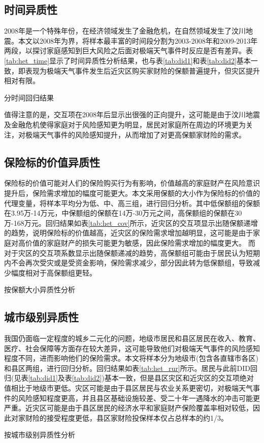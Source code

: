 \subsection{时间异质性}
2008年是一个特殊年份，在经济领域发生了金融危机，在自然领域发生了汶川地震。本文以2008年为界，将样本最丰富的时间段分割为2003-2008年和2009-2013年两段，以探讨家庭感知到巨大风险之后面对极端天气事件时反应是否有差异。表\ref{tab:het_time}显示了时间异质性分析结果，也与表\ref{tab:did1}和表\ref{tab:did2}基本一致，即表现为极端天气事件发生后近灾区购买家财险的保额普遍提升，但灾区提升相对有限。

\begin{table}[H]
    \centering
    \caption{分时间回归结果}\label{tab:het_time}
    
\end{table}

值得注意的是，交互项在2008年后显示出很强的正向提升，这可能是由于汶川地震及金融危机使得家庭对于风险感知更为明显，居民对家庭所在周边的环境更为关注，对极端天气事件的风险感知提升，从而增加了对更高保额家财险的需求。

\subsection{保险标的价值异质性}

保险标的价值可能对人们的保险购买行为有影响，价值越高的家庭财产在风险意识提升后，保险需求增加的幅度可能更大。本文采用保额的大小作为保险标的价值的代理变量，将样本平均分为低、中、高三组，进行回归分析。其中低保额组的保额在3.95万-14万元，中保额组的保额在14万-30万元之间，高保额组的保额在30万-168万元。回归结果如表\ref{tab:het_cov}所示，近灾区的交互项显示出随保额递增的趋势，说明保险标的价值越高，近灾区的保险需求增加越明显，这可能是由于家庭对高价值的家庭财产的损失可能更为敏感，因此保险需求增加的幅度更大。
而对于灾区的交互项系数显示出随保额递减的趋势，高保额组可能由于居民认为短期内不会再次受灾或是受资金影响，保险需求减少，部分因此转为低保额组，导致减少幅度相对于高保额组更轻。
\begin{table}
    \centering
    \caption{按保额大小异质性分析}\label{tab:het_cov}
    
\end{table}

\subsection{城市级别异质性}

我国仍面临一定程度的城乡二元化的问题，地级市居民和县区居民在收入、教育、医疗、社会保障等方面存在较大差异，这可能导致他们对极端天气事件的风险感知程度不同，进而影响他们的保险需求。本文将样本分为地级市(包含各直辖市各区)和县区两组，进行回归分析。回归结果如表\ref{tab:het_rur}所示。居民与此前DID回归(见表\ref{tab:did1}及表\ref{tab:did2})基本一致，但是县区灾区和近灾区的交互项绝对值相比于地级市更低。灾区可能是由于县区居民与农业关系更密切，对极端天气事件的风险感知程度更高，并且县区基础设施较差、受二十年一遇降水的冲击可能更严重。近灾区可能是由于县区居民的经济水平和家庭财产保险覆盖率相对较低\citep{falco2014crop,胡新艳2021气候变化,TJLT202108007}，因此对家财险的接受程度更低，县区家财险投保样本仅占总样本的约1/3。

\begin{table}[ht]
    \centering
    \caption{按城市级别异质性分析}\label{tab:het_rur}
    
\end{table}
